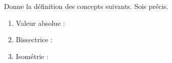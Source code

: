 %
%
    Donne la définition des concepts suivants. Sois précis.
    \begin{enumerate}[itemsep=2cm, after=\vspace*{2cm}]
        \item Valeur absolue :
        \item Bissectrice :
        \item Isométrie :
    \end{enumerate}
